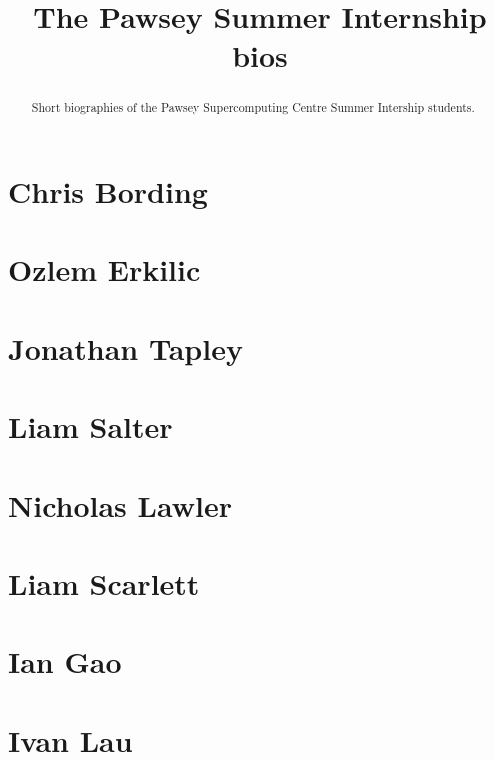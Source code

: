 \documentclass[11pt,a4paper]{report}
\title{The Pawsey Summer Internship bios}
\begin{document}
\maketitle
\tableofcontents


\begin{abstract}

Short biographies of the Pawsey Supercomputing Centre Summer Intership students.

\end{abstract}

\chapter{Chris Bording}


\chapter{Ozlem Erkilic}


\chapter{Jonathan Tapley}


\chapter{Liam Salter}


\chapter{Nicholas Lawler}


\chapter{Liam Scarlett}


\chapter{Ian Gao}


\chapter{Ivan Lau}

\end{document}
